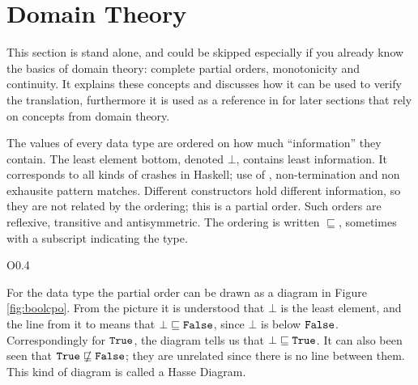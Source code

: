 \section{Domain Theory}
\label{sec:domaintheory}

This section is stand alone, and could be skipped especially if you
already know the basics of domain theory: comp\-lete partial orders,
monotonicity and continuity.  It explains these concepts and discusses
how it can be used to verify the translation, furthermore it is used
as a reference in for later sections that rely on concepts from domain
theory.

The values of every data type are ordered on how much ``information''
they contain. The least element bottom, denoted $\bot$, contains least
information. It corresponds to all kinds of crashes in Haskell; use of
, non-termination and non exhausite pattern matches.
Different constructors hold different information, so they are not
related by the ordering; this is a partial order. Such orders are
reflexive, transitive and antisymmetric. The ordering is written
$\sqsubseteq$, sometimes with a subscript indicating the type.

\begin{wrapfigure}{O}{0.4\textwidth} %
\vspace{-7pt}
\centering 
\vspace{-7pt}
\caption{
    The order of Bool values.
    \label{fig:boolcpo}
}
\end{wrapfigure}
For the  data type the partial order can be drawn as a
diagram in Figure \ref{fig:boolcpo}.  From the picture it is
understood that $\bot$ is the least element, and the line from it to
 means that $\bot \sqsubseteq \hs{False}$, since $\bot$ is
below $\hs{False}$. Correspondingly for $\hs{True}$, the diagram tells
us that $\bot \sqsubseteq \hs{True}$. It can also been seen that
$\hs{True} \nsqsubseteq \hs{False}$; they are unrelated since there is
no line between them. This kind of diagram is called a Hasse Diagram.

%


